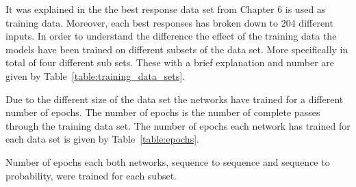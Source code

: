 It was explained in the the best response data set from Chapter 6 is used as
training data. Moreover, each best responses has broken down to 204 different
inputs. In order to understand the difference the effect of the training data
the models have been trained on different subsets of the data set. More
specifically in total of four different sub sets. These with a brief explanation
and number are given by Table~\ref{table:training_data_sets}.

\begin{table}[htb]
    \centering
    \caption{Subset of data set that the networks are trained on. The APL project
    performs a round robin tournament with all the strategies implemented on every release.
    The top strategies and the strategies across are based on the results of the tournament
    with APL version 4.5.0.}\label{table:training_data_sets}
\end{table}

Due to the different size of the data set the networks have trained for a different
number of epochs. The number of epochs is the number of complete passes through
the training data set. The number of epochs each network has trained for each
data set is given by Table~\ref{table:epochs}.

\begin{table}[!htbp]
    \begin{center}
    \resizebox{.9\textwidth}{!}{
        
    }
\end{center}
\caption{Number of epochs each both networks, sequence to sequence and 
sequence to probability, were trained for each subset.}\label{table:epochs}
\end{table}

